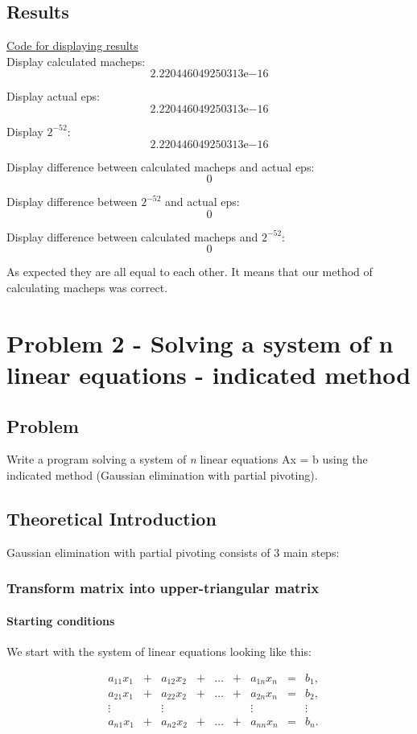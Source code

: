 \documentclass[12pt]{report}
\begin{document}
\section{Results}
\hyperlink{function1_display}{Code for displaying results}\\
Display calculated macheps:
     \[2.220446049250313\mathrm{e}{-16}\]

Display actual eps:
     \[2.220446049250313\mathrm{e}{-16}\]

Display $2^{-52}$:
     \[2.220446049250313\mathrm{e}{-16}\]

Display difference between calculated macheps and actual eps:
     \[0\]

Display difference between $2^{-52}$ and actual eps:
          \[0\]

Display difference between calculated macheps and $2^{-52}$:
         \[0\]

As expected they are all equal to each other. It means that our method of calculating macheps was correct.

\chapter{Problem 2 - Solving a system of n linear equations - indicated method}

\section{Problem}
Write a program solving a system of \textit{n} linear equations Ax = b using the indicated method (Gaussian elimination with partial pivoting).

\section{Theoretical Introduction}
Gaussian elimination with partial pivoting consists of 3 main steps:
\subsection{Transform matrix into upper-triangular matrix}

\subsubsection{Starting conditions}
We start with the system of linear equations looking like this:

\[
\begin{matrix}

&a_{11}x_1 &{}+&a_{12}x_2&+&\dots&+&a_{1n}x_n &=&b_1,\\

&a_{21}x_1 &{}+&a_{22}x_2&+&\dots&+&a_{2n}x_n &=&b_2,\\

&\vdots    &&\vdots      & &     & &  \vdots  & &\vdots\\

&a_{n1}x_1&{}+&a_{n2}x_2&+&\dots &+&a_{nn}x_n&=&b_n.

\end{matrix}
\]
\end{document}

